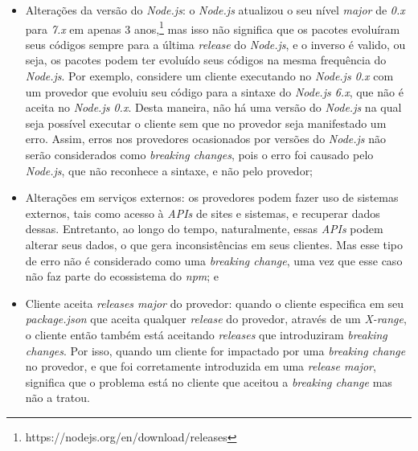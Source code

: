 \begin{itemize}
    \item Alterações da versão do \textit{Node.js}: o \textit{Node.js} atualizou o seu nível \textit{major} de \textit{0.x} para \textit{7.x} em apenas 3 anos,\footnote{https://nodejs.org/en/download/releases} mas isso não significa que os pacotes evoluíram seus códigos sempre para a última \textit{release} do \textit{Node.js}, e o inverso é valido, ou seja, os pacotes podem ter evoluído seus códigos na mesma frequência do \textit{Node.js}. Por exemplo, considere um cliente executando no \textit{Node.js 0.x} com um provedor que evoluiu seu código para a sintaxe do \textit{Node.js 6.x}, que não é aceita no \textit{Node.js 0.x}. Desta maneira, não há uma versão do \textit{Node.js}  na qual seja possível executar o cliente sem que no provedor seja manifestado um erro. Assim, erros nos provedores ocasionados por versões do \textit{Node.js} não serão considerados como \textit{breaking changes}, pois o erro foi causado pelo \textit{Node.js}, que não reconhece a sintaxe, e não pelo provedor;

    \item Alterações em serviços externos: os provedores podem fazer uso de sistemas externos, tais como acesso à \textit{APIs} de sites e sistemas, e recuperar dados dessas. Entretanto, ao longo do tempo, naturalmente, essas \textit{APIs} podem alterar seus dados, o que gera inconsistências em seus clientes. Mas esse tipo de erro não é considerado como uma \textit{breaking change}, uma vez que esse caso não faz parte do ecossistema do \textit{npm}; e
    \item Cliente aceita \textit{releases major} do provedor: quando o cliente especifica em seu \textit{package.json} que aceita qualquer \textit{release} do provedor, através de um \textit{X-range}, o cliente então também está aceitando \textit{releases} que introduziram \textit{breaking changes}. Por isso, quando um cliente for impactado por uma \textit{breaking change} no provedor, e que foi corretamente introduzida em uma \textit{release major}, significa que o problema está no cliente que aceitou a \textit{breaking change} mas não a tratou.
\end{itemize}{}

